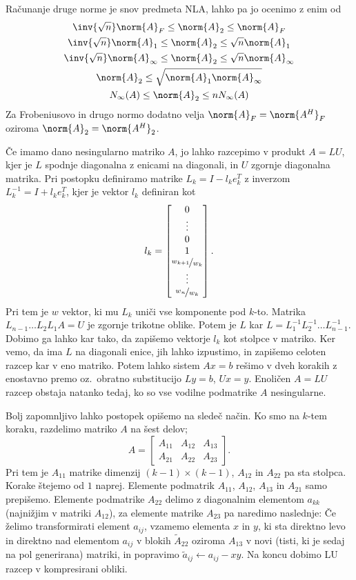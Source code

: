 Računanje druge norme je snov predmeta NLA, lahko pa jo ocenimo z enim od
\begin{gather*}
  \inv{\sqrt{n}} \norm{A}_F \le \norm{A}_2 \le \norm{A}_F \\
  \inv{\sqrt{n}} \norm{A}_1 \le \norm{A}_2 \le \sqrt{n} \norm{A}_1 \\
  \inv{\sqrt{n}} \norm{A}_\infty \le \norm{A}_2 \le \sqrt{n} \norm{A}_\infty \\
  \norm{A}_2 \le \sqrt{\norm{A}_1 \norm{A}_\infty} \\
  N_\infty(A) \le \norm{A}_2 \le n N_\infty(A)
\end{gather*}
Za Frobeniusovo in drugo normo dodatno velja $\norm{A}_F = \norm{A^H}_F$ oziroma
$\norm{A}_2 = \norm{A^H}_2$.


Če imamo dano nesingularno matriko $A$, jo lahko razcepimo v produkt $A = LU$,
kjer je $L$ spodnje diagonalna z enicami na diagonali, in $U$ zgornje diagonalna
matrika.
Pri postopku definiramo matrike $L_k = I - l_k e_k^T$ z inverzom $L_k^{-1} = I +
l_k e_k^T$, kjer je vektor $l_k$ definiran kot
\[
  l_k =
  \begin{bmatrix}
	0 \\ \vdots \\ 0 \\ 1 \\ \nicefrac{w_{k+1}}{w_k} \\ \vdots \\ \nicefrac{w_n}{w_k}
  \end{bmatrix}.
\]
Pri tem je $w$ vektor, ki mu $L_k$ uniči vse komponente pod $k$-to.
Matrika $L_{n-1} \ldots L_2 L_1 A = U$ je zgornje trikotne oblike.
Potem je $L$ kar $L = L_1^{-1} L_2^{-1} \ldots L_{n-1}^{-1}$.
Dobimo ga lahko kar tako, da zapišemo vektorje $l_k$ kot stolpce v matriko.
Ker vemo, da ima $L$ na diagonali enice, jih lahko izpustimo, in zapišemo
celoten razcep kar v eno matriko.
Potem lahko sistem $Ax = b$ rešimo v dveh korakih z enostavno premo oz.~obratno
substitucijo $L y = b$, $Ux = y$.
Enoličen $A = LU$ razcep obstaja natanko tedaj, ko so vse vodilne podmatrike $A$
nesingularne.

Bolj zapomnljivo lahko postopek opišemo na sledeč način.
Ko smo na $k$-tem koraku, razdelimo matriko $A$ na šest delov;
\[
  A =
  \begin{bmatrix}
	A_{11} & A_{12} & A_{13} \\
	A_{21} & A_{22} & A_{23}
  \end{bmatrix}.
\]
Pri tem je $A_{11}$ matrike dimenzij $(k-1) \times (k-1)$, $A_{12}$ in $A_{22}$
pa sta stolpca.
Korake štejemo od $1$ naprej.
Elemente podmatrik $A_{11}$, $A_{12}$, $A_{13}$ in $A_{21}$ samo prepišemo.
Elemente podmatrike $A_{22}$ delimo z diagonalnim elementom $a_{kk}$ (najnižjim
v matriki $A_{12}$), za elemente matrike $A_{23}$ pa naredimo naslednje:
Če želimo transformirati element $a_{ij}$, vzamemo elementa $x$ in $y$, ki sta
direktno levo in direktno nad elementom $a_{ij}$ v blokih $\tilde{A}_{22}$
oziroma $A_{13}$ v novi (tisti, ki je sedaj na pol generirana) matriki, in
popravimo $\tilde{a}_{ij} \gets a_{ij} - xy$.
Na koncu dobimo LU razcep v kompresirani obliki.

